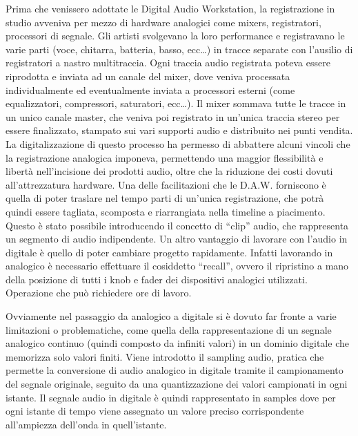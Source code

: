 \documentclass[a4paper,12pt]{report}
\begin{document}
Prima che venissero adottate le Digital Audio Workstation, la registrazione in studio avveniva per mezzo di hardware analogici come mixers, registratori, processori di segnale.
Gli artisti svolgevano la loro performance e registravano le varie parti (voce, chitarra, batteria, basso, ecc…) in tracce separate con l’ausilio di registratori a nastro multitraccia.
Ogni traccia audio registrata poteva essere riprodotta e inviata ad un canale del mixer, dove veniva processata individualmente ed eventualmente inviata a processori esterni (come equalizzatori, compressori, saturatori, ecc…).
Il mixer sommava tutte le tracce in un unico canale master, che veniva poi registrato in un'unica traccia stereo per essere finalizzato, stampato sui vari supporti audio e distribuito nei punti vendita.
La digitalizzazione di questo processo ha permesso di abbattere alcuni vincoli che la registrazione analogica imponeva, permettendo una maggior flessibilità e libertà nell’incisione dei prodotti audio, oltre che la riduzione dei costi dovuti all’attrezzatura hardware.
Una delle facilitazioni che le D.A.W. forniscono è quella di poter traslare nel tempo parti di un'unica registrazione, che potrà quindi essere tagliata, scomposta e riarrangiata nella timeline a piacimento. Questo è stato possibile introducendo il concetto di “clip” audio, che rappresenta un segmento di audio indipendente. 
Un altro vantaggio di lavorare con l’audio in digitale è quello di poter cambiare progetto rapidamente. Infatti lavorando in analogico è necessario effettuare il cosiddetto “recall”, ovvero il ripristino a mano della posizione di tutti i knob e fader dei dispositivi analogici utilizzati. Operazione che può richiedere ore di lavoro.

Ovviamente nel passaggio da analogico a digitale si è dovuto far fronte a varie limitazioni o problematiche, come quella della rappresentazione di un segnale analogico continuo (quindi composto da infiniti valori) in un dominio digitale che memorizza solo valori finiti. Viene introdotto il sampling audio, pratica che permette la conversione di audio analogico in digitale tramite il campionamento del segnale originale, seguito da una quantizzazione dei valori campionati in ogni istante.
Il segnale audio in digitale è quindi rappresentato in samples dove per ogni istante di tempo viene assegnato un valore preciso corrispondente all’ampiezza dell’onda in quell’istante.
\end{document}
